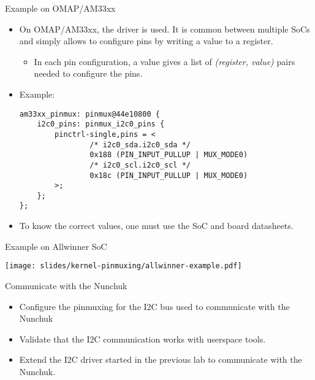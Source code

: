 \begin{frame}[fragile]{Example on OMAP/AM33xx}
  \begin{itemize}
  \item On OMAP/AM33xx, the  driver is used. It
    is common between multiple SoCs and simply allows to configure
    pins by writing a value to a register.
    \begin{itemize}
    \item In each pin configuration, a  value
      gives a list of {\em (register, value)} pairs needed to configure
      the pins.
    \end{itemize}
  \item Example:
    \begin{verbatim}
am33xx_pinmux: pinmux@44e10800 {
    i2c0_pins: pinmux_i2c0_pins {
        pinctrl-single,pins = <
                /* i2c0_sda.i2c0_sda */
                0x188 (PIN_INPUT_PULLUP | MUX_MODE0)
                /* i2c0_scl.i2c0_scl */
                0x18c (PIN_INPUT_PULLUP | MUX_MODE0)
        >;
    };
};
    \end{verbatim}
  \item To know the correct values, one must use the SoC and board
    datasheets.
  \end{itemize}
\end{frame}

\begin{frame}[fragile]{Example on Allwinner SoC}
  \begin{center}
    \texttt{[image: slides/kernel-pinmuxing/allwinner-example.pdf]}
  \end{center}
\end{frame}

\setuplabframe
{Communicate with the Nunchuk}
{
  \begin{itemize}
  \item Configure the pinmuxing for the I2C bus used to communicate
    with the Nunchuk
  \item Validate that the I2C communication works with userspace
    tools.
  \item Extend the I2C driver started in the previous lab to
    communicate with the Nunchuk.
  \end{itemize}
}
